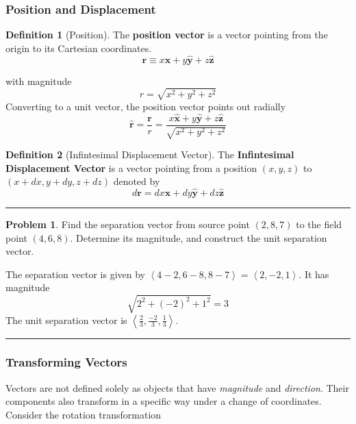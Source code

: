 \documentclass{article}
\theoremstyle{definition}
\newtheorem*{definition}{Definition}
\newtheorem{problem}{Problem}[section]
\theoremstyle{remark}
\newcommand{\pline}{\par\noindent\rule{\textwidth}{0.5pt}}
\newcommand{\components}[1]{\left\langle #1 \right\rangle}
\renewcommand{\vec}{\mathbf}
\newcommand{\xhat}{\hat{\vec{x}}}
\newcommand{\yhat}{\hat{\vec{y}}}
\newcommand{\zhat}{\hat{\vec{z}}}
\newcommand{\rhat}{\hat{\vec{r}}}
\begin{document}
\subsubsection{Position and Displacement}
\begin{definition}[Position]
The \textbf{position vector} is a vector pointing from the origin to its Cartesian coordinates.
\begin{equation}
\vec{r}\equiv x\xhat+y\yhat+z\zhat
\end{equation}
\end{definition}
with magnitude
\begin{equation}
r = \sqrt{x^2+y^2+z^2}
\end{equation}
Converting to a unit vector, the position vector points out radially
\begin{equation}
\rhat = \frac{\vec{r}}{r} = \frac{x\xhat+y\yhat+z\zhat}{\sqrt{x^2+y^2+z^2}}
\end{equation}

\begin{definition}[Infintesimal Displacement Vector]
The \textbf{Infintesimal Displacement Vector} is a vector pointing from a position $(x,y,z)$ to $(x+dx,y+dy,z+dz)$ denoted by
\begin{equation}
d\vec{r} = dx\xhat+dy\yhat+dz\zhat
\end{equation}
\end{definition}

\addtocounter{equation}{6}

\pline
\begin{problem}
Find the separation vector from source point $(2,8,7)$ to the field point $(4,6,8)$. Determine its magnitude, and construct the unit separation vector.
\end{problem}
The separation vector is given by $\components{4-2,6-8,8-7}=\components{2,-2,1}$. It has magnitude \[\sqrt{2^2+(-2)^2+1^2}=3\] The unit separation vector is $\components{\frac{2}{3},\frac{-2}{3},\frac{1}{3}}$.
\pline

\subsubsection{Transforming Vectors}
Vectors are not defined solely as objects that have \textit{magnitude} and \textit{direction}. Their components also transform in a specific way under a change of coordinates. Consider the rotation transformation
\end{document}
